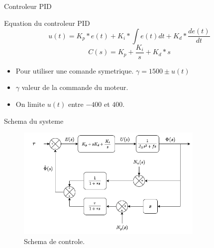 \documentclass{beamer}
\begin{document}
\begin{frame}{Controleur PID}
	\begin{block}{Equation du controleur PID}
		\begin{equation*}
			u(t) = K_p * e(t) + K_i * \int e(t) dt + K_d * \frac{de(t)}{dt}
		\end{equation*}
		\begin{equation}
			C(s) = K_p + \frac{K_i}{s} + K_d * s
		\end{equation}
	\end{block}
	\begin{itemize}
		\item Pour utiliser une comande symetrique. $\gamma = 1500 \pm u(t)$
		\item $\gamma$ valeur de la commande du moteur.
		\item On limite $u(t)$ entre $-400$ et $400$.
	\end{itemize}
\end{frame}

\begin{frame}{Schema du systeme}
	\begin{figure}
		\centering
		\includegraphics[width=0.8\textwidth]{assets/final-diagram.png}
		\caption{Schema de controle.}
	\end{figure}
\end{frame}
\end{document}
